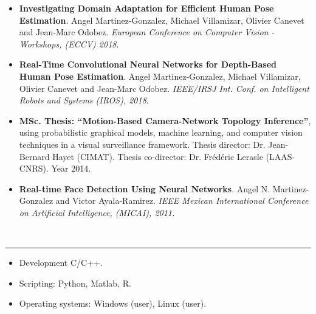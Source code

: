 \documentclass[10 pt]{article}
\newcommand{\mypartitle}[2][2.]{\vspace*{-#1 ex}~\\{\noindent {\bf #2}}}
\begin{document}
\begin{itemize}[noitemsep]
\item  \textbf{Investigating Domain Adaptation for Efficient Human Pose Estimation}.
Angel Martinez-Gonzalez, Michael Villamizar, Olivier Canevet and Jean-Marc Odobez.
\textit{European Conference on Computer Vision - Workshops, (ECCV) 2018}.
\vspace{.05cm}

\item \textbf{Real-Time Convolutional Neural Networks for Depth-Based Human Pose Estimation}.
Angel Martinez-Gonzalez, Michael Villamizar, Olivier Canevet and Jean-Marc Odobez.
\textit{IEEE/IRSJ Int. Conf. on Intelligent Robots and Systems (IROS), 2018}.
\vspace{.05cm}
%

\item \textbf{MSc. Thesis: “Motion-Based Camera-Network Topology Inference”}, using probabilistic graphical models, machine learning, and computer 
vision techniques in a visual surveillance framework. Thesis director: Dr. Jean-Bernard Hayet (CIMAT). 
Thesis co-director: Dr. Frédéric Lerasle (LAAS-CNRS). Year 2014.
\vspace{.05cm}
%

\item \textbf{Real-time Face Detection Using Neural Networks}. 
Angel N. Martinez-Gonzalez and Victor Ayala-Ramirez. 
\textit{IEEE Mexican International Conference on Artificial Intelligence, (MICAI), 2011.}
\vspace{.05cm}

\end{itemize}
%
%


\mypartitle{Skills}
\medskip
\hrule height 0.05cm

\begin{itemize}[noitemsep]
\item Development C/C++.
\item Scripting: Python,  Matlab, R.
\item Operating systems: Windows (user), Linux (user).
\end{itemize}
\end{document}
